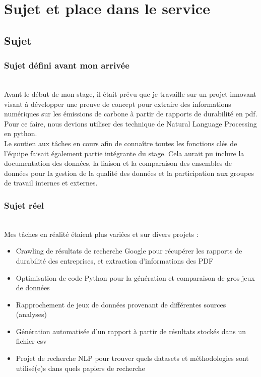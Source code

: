 \section{Sujet et place dans le service}
\subsection{Sujet}
\subsubsection{Sujet défini avant mon arrivée}
~\\
Avant le début de mon stage, il était prévu que je travaille sur un projet innovant visant à développer une preuve de concept pour extraire des informations numériques sur les émissions de carbone à partir de rapports de durabilité en pdf. 
Pour ce faire, nous devions utiliser des technique de Natural Language Processing en python.\\
Le soutien aux tâches en cours afin de connaître toutes les fonctions clés de l'équipe faisait également partie intégrante du stage. 
Cela aurait pu inclure la documentation des données, la liaison et la comparaison des ensembles de données pour la gestion de la qualité des données et la participation aux groupes de travail internes et externes.


\subsubsection{Sujet réel}
~\\
Mes tâches en réalité étaient plus variées et sur divers projets :
\begin{itemize}
    \item Crawling de résultats de recherche Google pour récupérer les rapports de durabilité des entreprises, et extraction d'informations des PDF
    \item Optimisation de code Python pour la génération et comparaison de gros jeux de données
    \item Rapprochement de jeux de données provenant de différentes sources (analyses)
    \item Génération automatisée d'un rapport à partir de résultats stockés dans un fichier csv
    \item Projet de recherche NLP pour trouver quels datasets et méthodologies sont utilisé(e)s dans quels papiers de recherche
\end{itemize}


